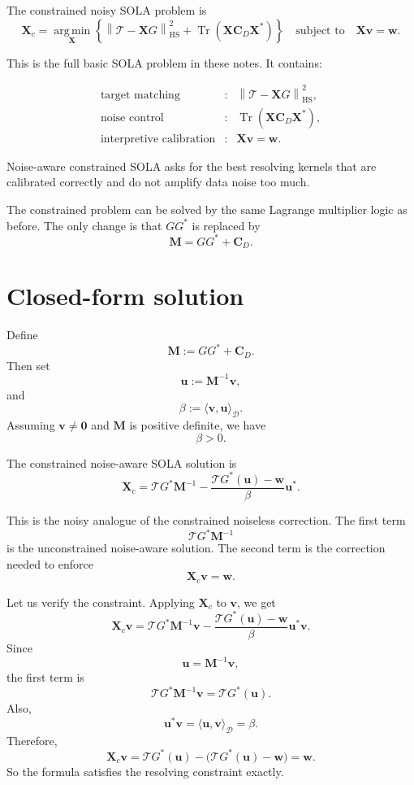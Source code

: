\documentclass[11pt,openany]{book}
\theoremstyle{definition}
\theoremstyle{remark}
\newcommand{\D}{\mathcal D}
\newcommand{\Tau}{\mathcal{T}}
\newcommand{\Tr}{\operatorname{Tr}}
\newcommand{\HS}{\mathrm{HS}}
\newcommand{\argmin}{\operatorname*{arg\,min}}
\begin{document}
The constrained noisy SOLA problem is
\[
  \mathbf X_c
  =
  \argmin_{\mathbf X}
  \left\{
    \left\|
      \Tau-\mathbf XG
    \right\|_{\HS}^2
    +
    \Tr(\mathbf X\mathbf C_D\mathbf X^*)
  \right\}
  \quad
  \text{subject to}
  \quad
  \mathbf X\mathbf v=\mathbf w.
\]

This is the full basic SOLA problem in these notes. It contains:

\[
  \begin{array}{lll}
    \text{target matching} &:& \left\|\Tau-\mathbf XG\right\|_{\HS}^2,\\[0.3em]
    \text{noise control} &:& \Tr(\mathbf X\mathbf C_D\mathbf X^*),\\[0.3em]
    \text{interpretive calibration} &:& \mathbf X\mathbf v=\mathbf w.
  \end{array}
\]

\begin{checkpointbox}
Noise-aware constrained SOLA asks for the best resolving kernels that are calibrated correctly
and do not amplify data noise too much.
\end{checkpointbox}

The constrained problem can be solved by the same Lagrange multiplier logic as before. The
only change is that \(GG^*\) is replaced by
\[
  \mathbf M=GG^*+\mathbf C_D.
\]

\section{Closed-form solution}

Define
\[
  \mathbf M
  :=
  GG^*+\mathbf C_D.
\]
Then set
\[
  \mathbf u
  :=
  \mathbf M^{-1}\mathbf v,
\]
and
\[
  \beta
  :=
  \langle \mathbf v,\mathbf u\rangle_{\D}.
\]
Assuming \(\mathbf v\neq \mathbf 0\) and \(\mathbf M\) is positive definite, we have
\[
  \beta>0.
\]

The constrained noise-aware SOLA solution is
\[
  \mathbf X_c
  =
  \Tau G^*\mathbf M^{-1}
  -
  \frac{\Tau G^*(\mathbf u)-\mathbf w}{\beta}
  \mathbf u^*.
\]

This is the noisy analogue of the constrained noiseless correction. The first term
\[
  \Tau G^*\mathbf M^{-1}
\]
is the unconstrained noise-aware solution. The second term is the correction needed to enforce
\[
  \mathbf X_c\mathbf v=\mathbf w.
\]

Let us verify the constraint. Applying \(\mathbf X_c\) to \(\mathbf v\), we get
\[
  \mathbf X_c\mathbf v
  =
  \Tau G^*\mathbf M^{-1}\mathbf v
  -
  \frac{\Tau G^*(\mathbf u)-\mathbf w}{\beta}
  \mathbf u^*\mathbf v.
\]
Since
\[
  \mathbf u=\mathbf M^{-1}\mathbf v,
\]
the first term is
\[
  \Tau G^*\mathbf M^{-1}\mathbf v
  =
  \Tau G^*(\mathbf u).
\]
Also,
\[
  \mathbf u^*\mathbf v
  =
  \langle \mathbf u,\mathbf v\rangle_{\D}
  =
  \beta.
\]
Therefore,
\[
  \mathbf X_c\mathbf v
  =
  \Tau G^*(\mathbf u)
  -
  \bigl(\Tau G^*(\mathbf u)-\mathbf w\bigr)
  =
  \mathbf w.
\]
So the formula satisfies the resolving constraint exactly.
\end{document}
